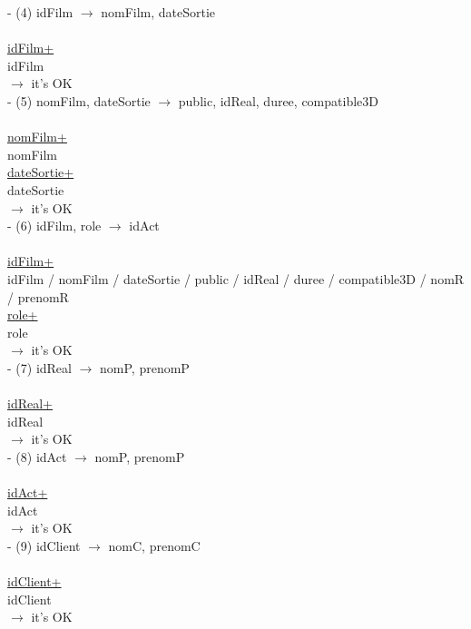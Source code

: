 \documentclass[a4paper,sffamily,12pt]{article}
\begin{document}
				\noindent - (4) idFilm $\rightarrow$ nomFilm, dateSortie \\
					\\
					\underline{idFilm+} \\
					idFilm\\								
				$\rightarrow$ it's OK \\	
				
				\noindent - (5) nomFilm, dateSortie $\rightarrow$ public, idReal, duree, compatible3D \\
					\\
					\underline{nomFilm+} \\
					nomFilm \\
					\underline{dateSortie+} \\
					dateSortie \\									
				$\rightarrow$ it's OK \\	
				
				\noindent - (6) idFilm, role $\rightarrow$  idAct  \\
					\\
					\underline{idFilm+} \\
					idFilm / nomFilm / dateSortie / public / idReal / duree / compatible3D / nomR / prenomR \\
					\underline{role+} \\
					role \\									
				$\rightarrow$ it's OK \\																				
	
				\noindent - (7) idReal $\rightarrow$ nomP, prenomP \\
					\\
					\underline{idReal+} \\
					idReal \\								
				$\rightarrow$ it's OK \\	
				
				\noindent - (8) idAct $\rightarrow$ nomP, prenomP \\
					\\
					\underline{idAct+} \\
					idAct \\									
				$\rightarrow$ it's OK \\	

				\noindent - (9) idClient $\rightarrow$ nomC, prenomC \\
					\\
					\underline{idClient+} \\
					idClient \\									
				$\rightarrow$ it's OK \\		
\end{document}
